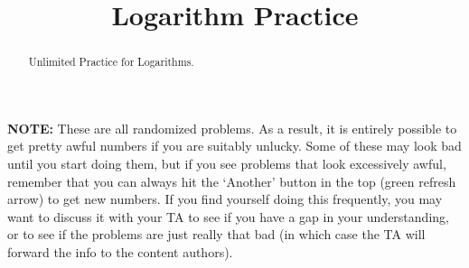 \documentclass{ximera}
\title{Logarithm Practice}
\begin{document}
\begin{abstract}
    Unlimited Practice for Logarithms.
\end{abstract}
\maketitle

\textbf{NOTE:} These are all randomized problems. As a result, it is entirely possible to get pretty awful numbers if you are suitably unlucky. Some of these may look bad until you start doing them, but if you see problems that look excessively awful, remember that you can always hit the `Another' button in the top (green refresh arrow) to get new numbers. If you find yourself doing this frequently, you may want to discuss it with your TA to see if you have a gap in your understanding, or to see if the problems are just really that bad (in which case the TA will forward the info to the content authors).

%
\end{document}
